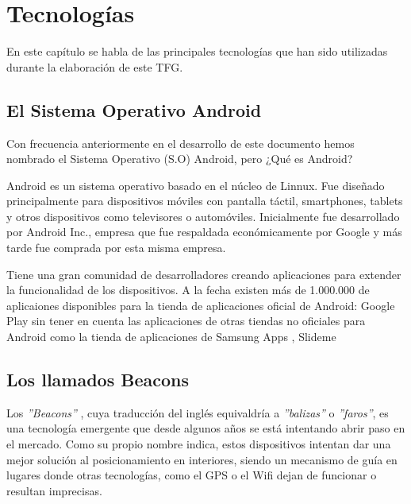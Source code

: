 %
%
%

\cleardoublepage
\chapter{Tecnologías} \label{chap:polytopes} %

En este capítulo se habla de las principales tecnologías que han sido utilizadas durante la elaboración de este TFG.


\section{El Sistema Operativo Android}

Con frecuencia anteriormente en el desarrollo de este documento hemos nombrado el Sistema Operativo (S.O) Android, pero ¿Qué es Android?

Android es un sistema operativo basado en el núcleo de Linnux. Fue diseñado principalmente para dispositivos móviles con pantalla táctil, smartphones, tablets y otros dispositivos como televisores o automóviles. Inicialmente fue desarrollado por Android Inc., empresa que fue respaldada económicamente por Google y más tarde fue comprada por esta misma empresa.


Tiene una gran comunidad de desarrolladores creando aplicaciones para extender la funcionalidad de los dispositivos. A la fecha existen más de 1.000.000 de aplicaiones disponibles para la tienda de aplicaciones oficial de Android: Google Play \cite{URL::GooglePlay} sin tener en cuenta las aplicaciones de otras tiendas no oficiales para Android como la tienda de aplicaciones de Samsung Apps \cite{URL::SamsungApps}, Slideme 

\section{Los llamados Beacons}

Los \textit{''Beacons''} \cite{URL::Beacon}, cuya traducción del inglés equivaldría a \textit{''balizas''} o \textit{''faros''}, es una tecnología emergente que desde algunos años se está intentando abrir paso en el mercado. Como su propio nombre indica, estos dispositivos intentan dar una mejor solución al posicionamiento en interiores, siendo un mecanismo de guía en lugares donde otras tecnologías, como el GPS o el Wifi dejan de funcionar o resultan imprecisas. 

